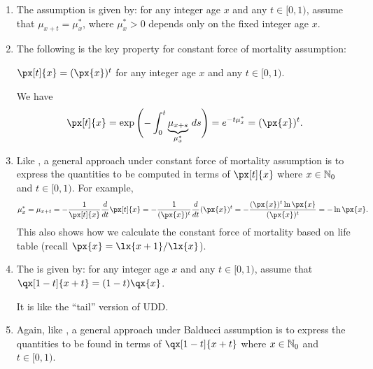 \begin{enumerate}
\item The  assumption is given by: for any
integer age \(x\) and any \(t\in[0,1)\), assume that \(\mu_{x+t}=\mu_x^*\),
where \(\mu_x^*>0\) depends only on the fixed integer age \(x\).
\item The following is the key property for constant force of mortality
assumption:
\begin{proposition}
\label{prp:cfm-key-prop}
\(\px[t]{x}=(\px{x})^t\) for any integer age \(x\) and any \(t\in[0,1)\).
\end{proposition}
\begin{pf}
We have
\[
\px[t]{x}=\exp\qty\Bigg(-\int_{0}^{t}\underbrace{\mu_{x+s}}_{\mu_x^*}\,ds)
=e^{-t\mu_x^*}
=(\px{x})^t.
\]
\end{pf}
\item Like , a general approach under constant force
of mortality assumption is to express the quantities to be computed in terms of
\(\px[t]{x}\) where \(x\in\mathbb{N}_0\) and \(t\in[0,1)\). For example,
\[\mu_x^*=\mu_{x+t}
=-\frac{1}{\px[t]{x}}\frac{d}{dt}\px[t]{x}
=-\frac{1}{(\px{x})^t}\frac{d}{dt}(\px{x})^t
=-\frac{(\px{x})^t\ln\px{x}}{(\px{x})^t}
=-\ln\px{x}.
\]
This also shows how we calculate the constant force of mortality based on life
table (recall \(\px{x}=\lx{x+1}/\lx{x}\)).

\item The  is given by: for any integer age \(x\) and
any \(t\in [0,1)\), assume that \(\qx[1-t]{x+t}=(1-t)\qx{x}\). \begin{note}
It is like the ``tail'' version of UDD.
\end{note}
\item Again, like , a general approach under
Balducci assumption is to express the quantities to be found in terms of
\(\qx[1-t]{x+t}\) where \(x\in\mathbb{N}_0\) and \(t\in[0,1)\).
\end{enumerate}
